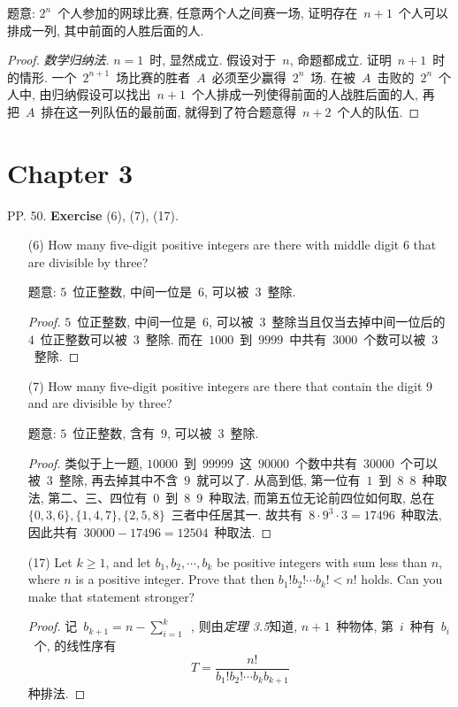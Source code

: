 \documentclass[UTF8,a4paper,10pt]{article}
\begin{document}
\begin{enumerate}
	      题意: $2^n$~个人参加的网球比赛, 任意两个人之间赛一场, 证明存在~$n+1$~个人可以排成一列, 其中前面的人胜后面的人.
	      \begin{proof}
		      \emph{数学归纳法}. $n=1$~时, 显然成立. 假设对于~$n$, 命题都成立. 证明~$n+1$~时的情形. 一个~$2^{n+1}$~场比赛的胜者~$A$~必须至少赢得~$2^n$~场. 在被~$A$~击败的~$2^n$~个人中, 由归纳假设可以找出~$n+1$~个人排成一列使得前面的人战胜后面的人, 再把~$A$~排在这一列队伍的最前面, 就得到了符合题意得~$n+2$~个人的队伍.
	      \end{proof}
\end{enumerate}

\section*{Chapter 3}
PP. 50. {\bf Exercise} (6), (7), (17).
\begin{enumerate}
	\item[(6)] How many five-digit positive integers are there with middle digit 6 that are divisible by three?

	      题意: $5$~位正整数, 中间一位是~$6$, 可以被~$3$~整除.
	      \begin{proof}
		      $5$~位正整数, 中间一位是~$6$, 可以被~$3$~整除当且仅当去掉中间一位后的~$4$~位正整数可以被~$3$~整除. 而在~$1000$~到~$9999$~中共有~$3000$~个数可以被~$3$~整除.
	      \end{proof}

	\item[(7)] How many five-digit positive integers are there that contain the digit 9 and are divisible by three?

	      题意: $5$~位正整数, 含有~$9$, 可以被~$3$~整除.
	      \begin{proof}
		      类似于上一题, $10000$~到~$99999$~这~$90000$~个数中共有~$30000$~个可以被~$3$~整除, 再去掉其中不含~$9$~就可以了. 从高到低, 第一位有~$1$~到~$8$~$8$~种取法, 第二、三、四位有~$0$~到~$8$~$9$~种取法, 而第五位无论前四位如何取, 总在~$\{0,3,6\},\{1,4,7\},\{2,5,8\}$~三者中任居其一. 故共有~$8\cdot 9^3\cdot 3=17496$~种取法, 因此共有~$30000-17496=12504$~种取法.
	      \end{proof}

	\item[(17)] Let $k\geqslant 1$, and let $b_1, b_2, \cdots , b_k$ be positive integers with sum less than
	      $n$, where $n$ is a positive integer. Prove that then
	      $b_1!b_2!\cdots b_k! < n!$
	      holds. Can you make that statement stronger?
	      \begin{proof}
		      记~$b_{k+1}=n-\sum_{i=1}^k$~, 则由\emph{定理 3.5}知道, $n+1$~种物体, 第~$i$~种有~$b_i$~个, 的线性序有
		      \[T=\dfrac{n!}{b_1!b_2!\cdots b_kb_{k+1}}\]
		      种排法.
	      \end{proof}
\end{enumerate}
\end{document}
